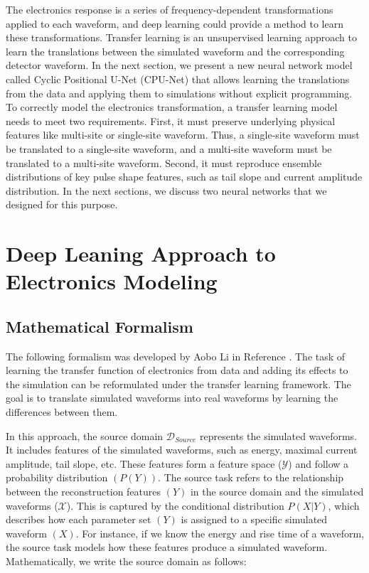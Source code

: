The electronics response is a series of frequency-dependent transformations applied to each waveform, and deep learning could provide a method to learn these transformations. Transfer learning is an unsupervised learning approach to learn the translations between the simulated waveform and the corresponding detector waveform. In the next section, we present a new neural network model called Cyclic Positional U-Net (CPU-Net) that allows learning the translations from the data and applying them to simulations without explicit programming. To correctly model the electronics transformation, a transfer learning model needs to meet two requirements. First, it must preserve underlying physical features like multi-site or single-site waveform. Thus, a single-site waveform must be translated to a single-site waveform, and a multi-site waveform must be translated to a multi-site waveform. Second, it must reproduce ensemble distributions of key pulse shape features, such as tail slope and current amplitude distribution. In the next sections, we discuss two neural networks that we designed for this purpose.


\section{Deep Leaning Approach to Electronics Modeling}
\subsection{Mathematical Formalism}
The following formalism was developed by Aobo Li in Reference \cite{Li_2022jon}. The task of learning the transfer function of electronics from data and adding its effects to the simulation can be reformulated under the transfer learning framework. The goal is to translate simulated waveforms into real waveforms by learning the differences between them.

In this approach, the source domain $\mathcal{D}_{Source}$ represents the simulated waveforms. It includes features of the simulated waveforms, such as energy, maximal current amplitude, tail slope, etc. These features form a feature space ($\mathcal{Y}$) and follow a probability distribution $(P(Y))$. The source task refers to the relationship between the reconstruction features $(Y)$ in the source domain and the simulated waveforms ($\mathcal{X}$). This is captured by the conditional distribution $P(X|Y)$, which describes how each parameter set $(Y)$ is assigned to a specific simulated waveform $(X)$. For instance, if we know the energy and rise time of a waveform, the source task models how these features produce a simulated waveform. Mathematically, we write the source domain as follows:

